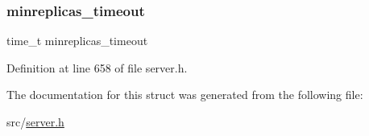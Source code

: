 \subsubsection{\texorpdfstring{minreplicas\+\_\+timeout}{minreplicas\_timeout}}
{\footnotesize\ttfamily time\+\_\+t minreplicas\+\_\+timeout}



Definition at line 658 of file server.\+h.



The documentation for this struct was generated from the following file\+:\begin{DoxyCompactItemize}
\item 
src/\hyperlink{server_8h}{server.\+h}\end{DoxyCompactItemize}
